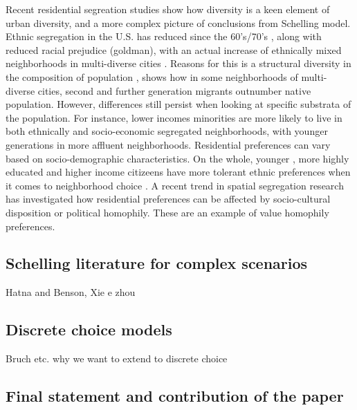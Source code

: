 \documentclass[
]{article}
\begin{document}
Recent residential segreation studies show how diversity is a keen element of urban diversity, and a more complex picture of conclusions from Schelling model. Ethnic segregation in the U.S. has reduced since the 60's/70's \citep{glaeser2012end}, along with reduced racial prejudice (goldman), with an actual increase of ethnically mixed neighborhoods in multi-diverse cities \citep{clark2015residential}. Reasons for this is a structural diversity in the composition of population \citep{lee2012racial}, \citet{crul2016super} shows how in some neighborhoods of multi-diverse cities, second and further generation migrants outnumber native population. However, differences still persist when looking at specific substrata of the population. For instance, lower incomes minorities are more likely to live in both ethnically and socio-economic segregated neighborhoods, with younger generations in more affluent neighborhoods. 
Residential preferences can vary based on socio-demographic characteristics. On the whole, younger \citep{clark2009changing,clark2018can}, more highly educated and higher income citizeens have more tolerant ethnic preferences when it comes to neighborhood choice \citep{clark2009changing,clark2019neighborhood,crowder2012neighborhood}. A recent trend in spatial segregation research has investigated how residential preferences can be affected by socio-cultural disposition \citep{van2019sociocultural} or  political homophily. These are an example of value homophily preferences.

\subsection{Schelling literature for complex scenarios}

Hatna and Benson, Xie e zhou

\subsection{Discrete choice models}
Bruch etc. why we want to extend to discrete choice

\subsection{Final statement and contribution of the paper}

\hfill \newline
\end{document}
